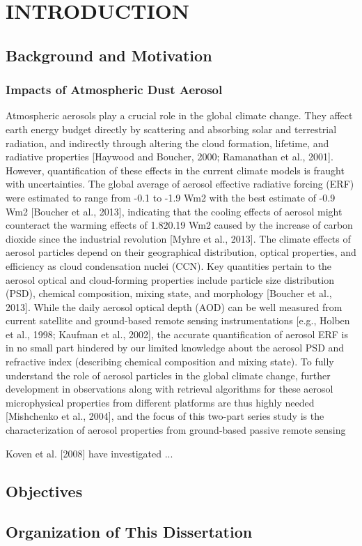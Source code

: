 \doublespacing

\chapter{INTRODUCTION}

\section{Background and Motivation}

\subsection{Impacts of Atmospheric Dust Aerosol}

Atmospheric aerosols play a crucial role in the global 
climate change. They affect earth energy budget directly 
by scattering and absorbing solar and terrestrial radiation, 
and indirectly through altering the cloud formation, 
lifetime, and radiative properties [Haywood and Boucher, 
2000; Ramanathan et al., 2001]. However, quantification of 
these effects in the current climate models is fraught with 
uncertainties. The global average of aerosol effective 
radiative forcing (ERF) were estimated to range from -0.1 
to -1.9 Wm2 with the best estimate of -0.9 Wm2 [Boucher et 
al., 2013], indicating that the cooling effects of aerosol 
might counteract the warming effects of 1.820.19 Wm2 caused
by the increase of carbon dioxide since the industrial 
revolution [Myhre et al., 2013]. The climate effects of 
aerosol particles depend on their geographical distribution, 
optical properties, and efficiency as cloud condensation 
nuclei (CCN). Key quantities pertain to the aerosol optical 
and cloud-forming properties include particle size 
distribution (PSD), chemical composition, mixing state, and 
morphology [Boucher et al., 2013]. While the daily aerosol 
optical depth (AOD) can be well measured from current 
satellite and ground-based remote sensing instrumentations 
[e.g., Holben et al., 1998; Kaufman et al., 2002], the 
accurate quantification of aerosol ERF is in no small part 
hindered by our limited knowledge about the aerosol PSD and 
refractive index (describing chemical composition and 
mixing state). To fully understand the role of aerosol 
particles in the global climate change, further development 
in observations along with retrieval algorithms for these 
aerosol microphysical properties from different platforms 
are thus highly needed [Mishchenko et al., 2004], and 
the focus of this two-part series study is the 
characterization of aerosol properties from ground-based 
passive remote sensing %

Koven et al. [2008] have investigated ...

\section{Objectives}

\section{Organization of This Dissertation}
